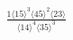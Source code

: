 \documentclass[varwidth, border=5pt]{standalone}
\begin{document}
\begin{my}
$\begin{gathered}
\scriptscriptstyle\frac{1⟨15⟩^3⟨45⟩^2⟨23⟩}{⟨14⟩^4⟨35⟩^3}
\end{gathered}$
\end{my}
\end{document}
